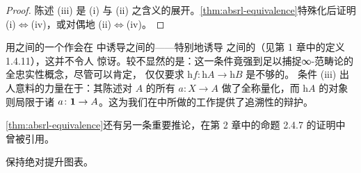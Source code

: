 \begin{proof}
陈述 (iii) 是 (i) 与 (ii) 之含义的展开。\cref{thm:absrl-equivalence}特殊化后证明 %
(i)$\Leftrightarrow$(iv)，或对偶地 (ii)$\Leftrightarrow$(iv)。
\end{proof}

用\trInfinityCategory{}之间的一个\trFullyFaithful{}\trFunctor{}作\trPostComposition{}会在%
\trHomotopyTwoCategory{}中诱导\trHomCategory{}之间的\trFullyFaithful{}\trFunctor——特别地诱导%
\trHomotopyCategory{}之间的\trFullyFaithful{}\trFunctor{}（见第 1 章中的定义 1.4.11），这并不令人%
惊讶。较不显然的是：这一条件竟强到足以捕捉∞-范畴论的全忠实性概念，尽管可以肯定，%
仅仅要求\trFunctor{} $\mathrm{h}f\colon\mathrm{h}A\to\mathrm{h}B$ \trFullyFaithful{}是不够的。%
条件 (iii) 出人意料的力量在于：其陈述对 $A$ 的所有\trGeneralizedElement{}%
$a\colon X\to A$ 做了全称量化，而 $\mathrm{h}A$ 的对象则局限于诸\trElement{}%
$a\colon\mathbf{1}\to A$。这为我们在\trHomotopyTwoCategory{}中所做的工作提供了追溯性的辩护。

\cref{thm:absrl-equivalence}还有另一条重要推论，在第 2 章中的命题 2.4.7 的证明中%
曾被引用。

\begin{corollary}\label{cor:cosmological-absrl}
\trCosmologicalFunctor{}保持绝对提升图表。
\end{corollary}

